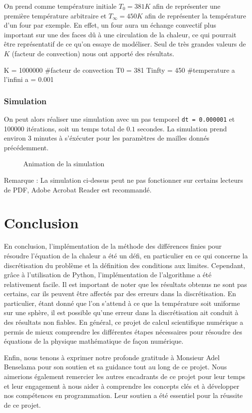 \documentclass[fleqn]{article}
\begin{document}
On prend comme température initiale $T_0 = 381K$ afin de représenter une première température arbitraire et $T_\infty = 450K$ afin de représenter la température d'un four par exemple. En effet, un four aura un échange convectif plus important sur une des faces dû à une circulation de la chaleur, ce qui pourrait être représentatif de ce qu'on essaye de modéliser.
Seul de très grandes valeurs de $K$ (facteur de convection) nous ont apporté des résultats.  


\begin{python}
    K =  1000000 #facteur de convection
    T0 = 381
    Tinfty = 450 #temperature a l'infini
    a = 0.001
\end{python}

\subsubsection{Simulation}

On peut alors réaliser une simulation avec un pas temporel \texttt{dt = 0.000001}  et 100000 itérations, soit un temps total de $0.1$ secondes. La simulation prend environ 3 minutes à s'éxécuter pour les paramètres de mailles donnés précédemment.

\begin{center}
    \begin{figure}[H]
        \centering
        \caption{Animation de la simulation}
    \end{figure}  
\end{center}

Remarque : La simulation ci-dessus peut ne pas fonctionner sur certains lecteurs de PDF, Adobe Acrobat Reader est recommandé.

\newpage
\section{Conclusion}
En conclusion, l'implémentation de la méthode des différences finies pour résoudre l'équation de la chaleur a été un défi, en particulier en ce qui concerne la discrétisation du problème et la définition des conditions aux limites. Cependant, grâce à l'utilisation de Python, l'implémentation de l'algorithme a été relativement facile. Il est important de noter que les résultats obtenus ne sont pas certains, car ils peuvent être affectés par des erreurs dans la discrétisation. En particulier, étant donné que l'on s'attend à ce que la température soit uniforme sur une sphère, il est possible qu'une erreur dans la discrétisation ait conduit à des résultats non fiables. En général, ce projet de calcul scientifique numérique a permis de mieux comprendre les différentes étapes nécessaires pour résoudre des équations de la physique mathématique de façon numérique.

Enfin, nous tenons à exprimer notre profonde gratitude à Monsieur Adel Benselama pour son soutien et sa guidance tout au long de ce projet. Nous aimerions également remercier les autres encadrants de ce projet pour leur temps et leur engagement à nous aider à comprendre les concepts clés et à développer nos compétences en programmation. Leur soutien a été essentiel pour la réussite de ce projet.
\end{document}
